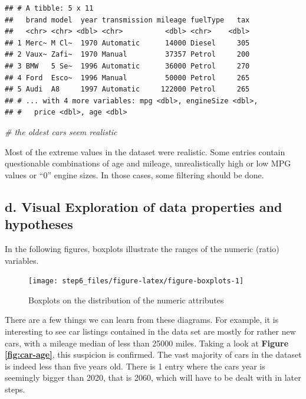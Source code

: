 \documentclass[sigchi]{acmart}
\newenvironment{Shaded}{\begin{snugshade}}{\end{snugshade}}
\newcommand{\CommentTok}[1]{\textcolor[rgb]{0.56,0.35,0.01}{\textit{#1}}}
\begin{document}
\begin{verbatim}
## # A tibble: 5 x 11
##   brand model  year transmission mileage fuelType   tax
##   <chr> <chr> <dbl> <chr>          <dbl> <chr>    <dbl>
## 1 Merc~ M Cl~  1970 Automatic      14000 Diesel     305
## 2 Vaux~ Zafi~  1970 Manual         37357 Petrol     200
## 3 BMW   5 Se~  1996 Automatic      36000 Petrol     270
## 4 Ford  Esco~  1996 Manual         50000 Petrol     265
## 5 Audi  A8     1997 Automatic     122000 Petrol     265
## # ... with 4 more variables: mpg <dbl>, engineSize <dbl>,
## #   price <dbl>, age <dbl>
\end{verbatim}

\begin{Shaded}
\begin{Highlighting}[]
\CommentTok{# the oldest cars seem realistic}
\end{Highlighting}
\end{Shaded}

Most of the extreme values in the dataset were realistic. Some entries contain questionable combinations of age and mileage, unrealistically high or low MPG values or ``0'' engine sizes. In those cases, some filtering should be done.

\hypertarget{d.-visual-exploration-of-data-properties-and-hypotheses}{%
\subsection{d. Visual Exploration of data properties and hypotheses}\label{d.-visual-exploration-of-data-properties-and-hypotheses}}

In the following figures, boxplots illustrate the ranges of the numeric (ratio) variables.

\begin{figure}
\texttt{[image: step6\_files/figure-latex/figure-boxplots-1]} \caption{Boxplots on the distribution of the numeric attributes}\label{fig:figure-boxplots}
\end{figure}

There are a few things we can learn from these diagrams. For example, it is interesting to see car listings contained in the data set are mostly for rather new cars, with a mileage median of less than 25000 miles. Taking a look at \textbf{Figure \ref{fig:car-age}}, this suspicion is confirmed. The vast majority of cars in the dataset is indeed less than five years old. There is 1 entry where the cars year is seemingly bigger than 2020, that is 2060, which will have to be dealt with in later steps.
\end{document}
